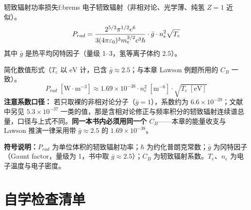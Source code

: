 \begin{formulabox}{轫致辐射功率损失}{f:brems}
电子轫致辐射（非相对论、光学薄、纯氢 $Z=1$ 近似）。
\[
    P_{rad} = \frac{2^{5/2}\pi^{1/2}e^6}{3(4\pi\varepsilon_0)^3 m_e^{3/2}c^3\hbar} \cdot \bar{g} \cdot n_e^2 \sqrt{T_e}
\]
其中 $\bar g$ 是热平均冈特因子（量级 1--3，氢等离子体约 $2.5$）。

简化数值形式（$T_e$ 以 $\mathrm{eV}$ 计，已含 $\bar g\approx2.5$；与本章 Lawson 例题所用的 $C_B$ 一致）。
\[
    P_{rad}\;[\mathrm{W\cdot m^{-3}}] \approx 1.69\times10^{-38} \cdot n_e^2\;[\mathrm{m^{-6}}] \cdot \sqrt{T_e\;[\mathrm{eV}]}
\]
\textbf{注意系数口径：} 若只取裸的非相对论分子（$\bar g=1$），系数约为 $6.6\times10^{-39}$；文献中另见 $5.3\times10^{-37}$ 一类的值，那是含相对论修正与频率积分的轫致辐射连续谱总量，口径与上式不同。\textbf{同一本书内必须用同一个 $C_B$}——本章的能量收支与 Lawson 推演一律采用带 $\bar g\approx2.5$ 的 $1.69\times10^{-38}$。

\textbf{符号说明：}$P_{rad}$ 为单位体积的轫致辐射功率；$\hbar$ 为约化普朗克常数；$\bar g$ 为冈特因子（Gaunt factor，量级为 1，书中取 $\bar g\approx2.5$）；$C_B$ 为轫致辐射系数。$T_e$、$n_e$ 为电子温度与电子密度。
\end{formulabox}


\section{自学检查清单}

